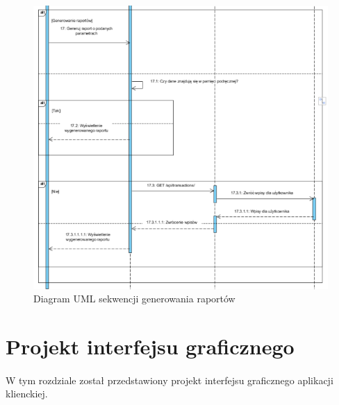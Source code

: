 \documentclass{article}
\begin{document}
	\begin{figure}[H]

		\hspace*{-1.5cm}
		\includegraphics[scale=0.9]{assets/sq8.png}
		\caption[]{Diagram UML sekwencji generowania raportów}
		\label{fig:umlrap}
	\end{figure}

	\section{Projekt interfejsu graficznego}
	\paragraph*{} W tym rozdziale został przedstawiony projekt interfejsu graficznego aplikacji klienckiej.
\end{document}
